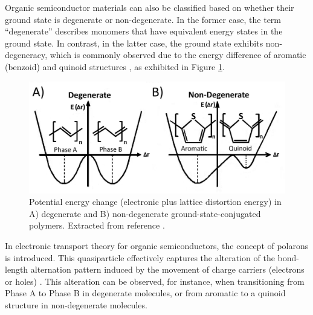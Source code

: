 

Organic semiconductor materials can also be classified based on whether their ground state is degenerate or non-degenerate. In the former case, the term ``degenerate'' describes monomers that have equivalent energy states in the ground state. In contrast, in the latter case, the ground state exhibits non-degeneracy, which is commonly observed due to the energy difference of aromatic (benzoid) and quinoid structures \cite{heegerSolitonsConductingPolymers1988a}, as exhibited in Figure \ref{fig:energy}.

\begin{figure}[ht]
  \centering
  \includegraphics[width=12cm]{Images/pdf/deg_pol.pdf}
  \caption[Degenerate and non-degenerate conjugated polymers]{Potential energy change (electronic plus lattice distortion energy) in A) degenerate and B) non-degenerate ground-state-conjugated polymers. Extracted from reference \cite{heydarigharahcheshmehTextureNanostructuralEngineering2020}.}
  \label{fig:energy}
\end{figure}

In electronic transport theory for organic semiconductors, the concept of polarons is introduced. This quasiparticle effectively captures the alteration of the bond-length alternation pattern induced by the movement of charge carriers (electrons or holes) \cite{bredasRoleMobileOrganic1984}. This alteration can be observed, for instance, when transitioning from Phase A to Phase B in degenerate molecules, or from aromatic to a quinoid structure in non-degenerate molecules.

